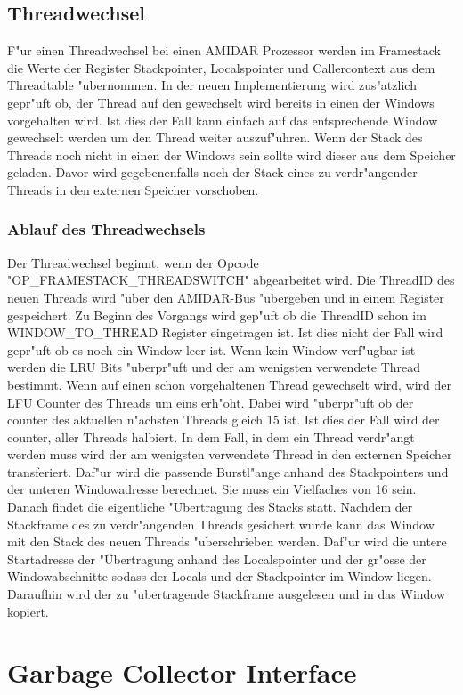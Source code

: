 \subsection{Threadwechsel}
F"ur einen Threadwechsel bei einen AMIDAR Prozessor werden im Framestack die Werte der Register Stackpointer, Localspointer und Callercontext aus dem Threadtable "ubernommen. In der neuen Implementierung wird zus"atzlich gepr"uft ob, der Thread auf den gewechselt wird bereits in einen der Windows vorgehalten wird. Ist dies der Fall kann einfach auf das entsprechende Window gewechselt werden um den Thread weiter auszuf"uhren. Wenn der Stack des Threads noch nicht in einen der Windows sein sollte wird dieser aus dem Speicher geladen. Davor wird gegebenenfalls noch der Stack eines zu verdr"angender Threads in den externen Speicher vorschoben. 
\subsubsection{Ablauf des Threadwechsels}
Der Threadwechsel beginnt, wenn der Opcode "OP\_FRAMESTACK\_THREADSWITCH" abgearbeitet wird. Die ThreadID des neuen Threads wird "uber den AMIDAR-Bus "ubergeben und in einem Register gespeichert. Zu Beginn des Vorgangs wird gep"uft ob die ThreadID schon im WINDOW\_TO\_THREAD Register eingetragen ist. Ist dies nicht der Fall wird gepr"uft ob es noch ein Window leer ist. 
Wenn kein Window verf"ugbar ist werden die LRU Bits "uberpr"uft und der am wenigsten verwendete Thread bestimmt. Wenn auf einen schon vorgehaltenen Thread gewechselt wird, wird der LFU Counter des Threads um eins erh"oht. Dabei wird "uberpr"uft ob der counter des aktuellen n"achsten Threads gleich 15 ist. Ist dies der Fall wird der counter, aller Threads halbiert. 
In dem Fall, in dem ein Thread verdr"angt werden muss wird der am wenigsten verwendete Thread in den externen Speicher transferiert. Daf"ur wird die passende Burstl"ange anhand des Stackpointers und der unteren Windowadresse berechnet. Sie muss ein Vielfaches von 16 sein. Danach findet die eigentliche "Ubertragung des Stacks statt. 
Nachdem der Stackframe des zu verdr"angenden Threads gesichert wurde kann das Window mit den Stack des neuen Threads "uberschrieben werden. Daf"ur wird die untere Startadresse der "Übertragung anhand des Localspointer und der gr"o{ss}e der Windowabschnitte soda{ss} der Locals und der Stackpointer im Window liegen. Daraufhin wird der zu "ubertragende Stackframe ausgelesen und in das Window kopiert.  

\section{Garbage Collector Interface}

